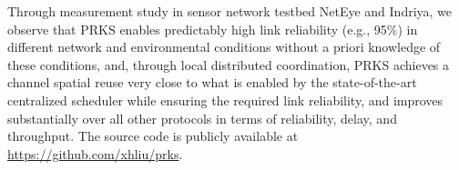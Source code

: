 {%
Through measurement study in sensor network testbed NetEye and Indriya, we observe that PRKS enables predictably high link reliability (e.g., 95\%) in different network and environmental conditions without a priori knowledge of these conditions, and, through local distributed coordination, PRKS achieves a channel spatial reuse very close to what is enabled by the state-of-the-art centralized scheduler while ensuring the required link reliability, and improves substantially over all other protocols in terms of reliability, delay, and throughput.
The source code is publicly available at \url{https://github.com/xhliu/prks}.
}


